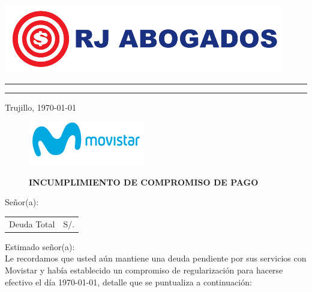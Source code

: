 %
%

\begin{flushleft}
\includegraphics[natwidth=12.170833333cm, natheight=2.989791667cm]{resources/logo.png}
\end{flushleft}
\vspace{-0.8cm}
\textcolor[rgb]{1.00,0.00,0.00}{
\hrule
\hrule
}

\begin{flushright}
    Trujillo, \today
\end{flushright}
\vspace{-0.5cm}

\begin{figure}[h]
\begin{minipage}[b]{5.106458333cm}
\includegraphics[natwidth=5.106458333cm, natheight=1.931458333cm]{resources/business_logo.png}
\end{minipage}
\begin{minipage}[b][1.9314cm][t]{11cm}
\hfill
\begin{flushright}
{\LARGE \bf INCUMPLIMIENTO DE COMPROMISO DE PAGO}
\end{flushright}
\end{minipage}
\end{figure}

\noindent
Señor(a):\\

\begin{flushright}
\bf \large
\begin{tabular}{|p{3.2cm} p{3.2cm}|}
\hline
Deuda Total & S/. %
\hline
\end{tabular}
\end{flushright}

\noindent
Estimado señor(a):\\
Le recordamos que usted aún mantiene una deuda pendiente por sus servicios con Movistar y había establecido un compromiso de regularización para hacerse efectivo el día \monthyeardate\today, detalle que se puntualiza a continuación:

